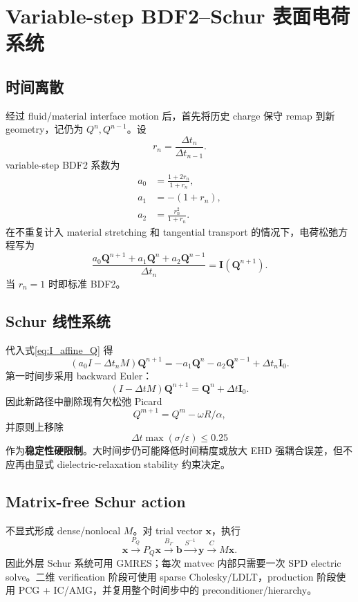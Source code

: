 \documentclass[UTF8,a4paper,11pt]{ctexart}
\newcommand{\eps}{\varepsilon}
\newcommand{\vct}[1]{\bm{#1}}
\begin{document}
\section{Variable-step BDF2--Schur 表面电荷系统}

\subsection{时间离散}

经过 fluid/material interface motion 后，首先将历史 charge 保守 remap 到新 geometry，记仍为 \(Q^n,Q^{n-1}\)。设
\[
r_n=\frac{\Delta t_n}{\Delta t_{n-1}}.
\]
variable-step BDF2 系数为
\begin{align}
a_0&=\frac{1+2r_n}{1+r_n},\\
a_1&=-(1+r_n),\\
a_2&=\frac{r_n^2}{1+r_n}.
\end{align}
在不重复计入 material stretching 和 tangential transport 的情况下，电荷松弛方程写为
\begin{equation}
\boxed{
\frac{a_0\vct Q^{n+1}+a_1\vct Q^n+a_2\vct Q^{n-1}}{\Delta t_n}
=\vct I(\vct Q^{n+1}).
}
\label{eq:bdf2_charge}
\end{equation}
当 \(r_n=1\) 时即标准 BDF2。

\subsection{Schur 线性系统}

代入式\eqref{eq:I_affine_Q} 得
\begin{equation}
\boxed{
\left(a_0I-\Delta t_nM\right)\vct Q^{n+1}
=-a_1\vct Q^n-a_2\vct Q^{n-1}
+\Delta t_n\vct I_0.
}
\label{eq:charge_schur}
\end{equation}
第一时间步采用 backward Euler：
\begin{equation}
\boxed{
\left(I-\Delta tM\right)\vct Q^{n+1}
=\vct Q^n+\Delta t\vct I_0.
}
\label{eq:BE_charge}
\end{equation}
因此新路径中删除现有欠松弛 Picard
\[
Q^{m+1}=Q^m-\omega R/\alpha,
\]
并原则上移除
\[
\Delta t\max(\sigma/\eps)\le0.25
\]
作为\textbf{稳定性硬限制}。大时间步仍可能降低时间精度或放大 EHD 强耦合误差，但不应再由显式 dielectric-relaxation stability 约束决定。

\subsection{Matrix-free Schur action}

不显式形成 dense/nonlocal \(M\)。对 trial vector \(\vct x\)，执行
\begin{equation}
\vct x
\xrightarrow{P_Q}
P_Q\vct x
\xrightarrow{B_\Gamma}
\vct b
\xrightarrow{S^{-1}}
\vct y
\xrightarrow{C}
M\vct x.
\label{eq:matrix_free_action}
\end{equation}
因此外层 Schur 系统可用 GMRES；每次 matvec 内部只需要一次 SPD electric solve。二维 verification 阶段可使用 sparse Cholesky/LDLT，production 阶段使用 PCG + IC/AMG，并复用整个时间步中的 preconditioner/hierarchy。
\end{document}
